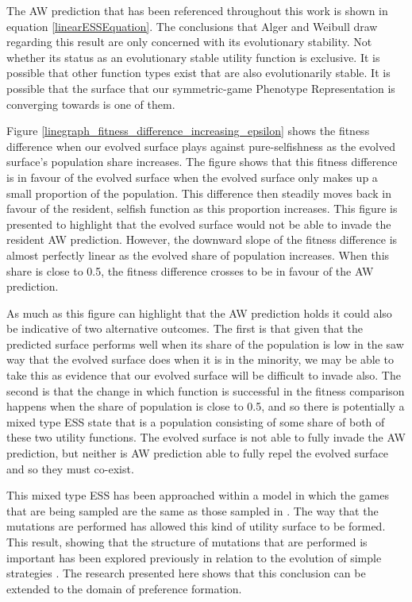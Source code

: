 \documentclass[11pt]{book}
\newcommand*{\np}{\par\noindent\newline}
\begin{document}
\np The AW prediction that has been referenced throughout this work is shown in equation \ref{linearESSEquation}.
The conclusions that Alger and Weibull draw regarding this result are only concerned with its evolutionary stability.
Not whether its status as an evolutionary stable utility function is exclusive.
It is possible that other function types exist that are also evolutionarily stable.
It is possible that the surface that our symmetric-game Phenotype Representation is converging towards is one of them.

\np Figure \ref{linegraph_fitness_difference_increasing_epsilon} 
shows the fitness difference when our evolved surface plays against pure-selfishness as the evolved surface's population share increases.
The figure shows that this fitness difference is in favour of the evolved surface when the evolved surface only makes up a small proportion of the population.
This difference then steadily moves back in favour of the resident, selfish function as this proportion increases.
This figure is presented to highlight that the evolved surface would not be able to invade the resident AW prediction.
However, the downward slope of the fitness difference is almost perfectly linear as the evolved share of population increases.
When this share is close to 0.5, the fitness difference crosses to be in favour of the AW prediction.

\np As much as this figure can highlight that the AW prediction holds it could also be indicative of two alternative outcomes.
The first is that given that the predicted surface performs well when its share of the population is low in the saw way that the evolved surface does when it is in the minority,
we may be able to take this as evidence that our evolved surface will be difficult to invade also.
The second is that the change in which function is successful in the fitness comparison happens when the share of population is close to 0.5,
and so there is potentially a mixed type ESS state that is a population consisting of some share of both of these two utility functions.
The evolved surface is not able to fully invade the AW prediction, but neither is AW prediction able to fully repel the evolved surface and so they must co-exist.

\np This mixed type ESS has been approached within a model in which the games that are being sampled are the same as those sampled in \citet{alger_generalization_2012}.
The way that the mutations are performed has allowed this kind of utility surface to be formed.
This result, showing that the structure of mutations that are performed is important has been explored previously in relation to the evolution of simple strategies \citep{garcia_structure_2012}.
The research presented here shows that this conclusion can be extended to the domain of preference formation.
\end{document}
